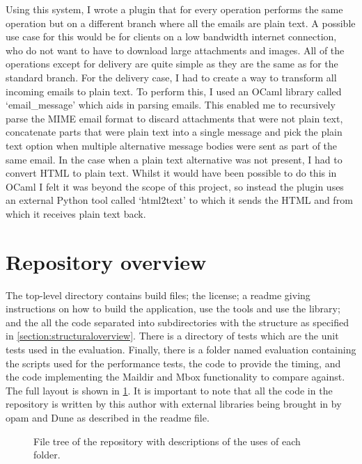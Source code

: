 Using this system, I wrote a plugin that for every operation performs the same operation but on a different branch where all the emails are plain text. A possible use case for this would be for clients on a low bandwidth internet connection, who do not want to have to download large attachments and images. All of the operations except for delivery are quite simple as they are the same as for the standard branch. For the delivery case, I had to create a way to transform all incoming emails to plain text. To perform this, I used an OCaml library called `email\_message' which aids in parsing emails. This enabled me to recursively parse the MIME email format to discard attachments that were not plain text, concatenate parts that were plain text into a single message and pick the plain text option when multiple alternative message bodies were sent as part of the same email. In the case when a plain text alternative was not present, I had to convert HTML to plain text. Whilst it would have been possible to do this in OCaml I felt it was beyond the scope of this project, so instead the plugin uses an external Python tool called `html2text' to which it sends the HTML and from which it receives plain text back.

\section{Repository overview}

The top-level directory contains build files; the license; a readme giving instructions on how to build the application, use the tools and use the library; and the all the code separated into subdirectories with the structure as specified in \ref{section:structuraloverview}. There is a directory of tests which are the unit tests used in the evaluation. Finally, there is a folder named evaluation containing the scripts used for the performance tests, the code to provide the timing, and the code implementing the Maildir and Mbox functionality to compare against. The full layout is shown in \ref{fig:repositorytree}. It is important to note that all the code in the repository is written by this author with external libraries being brought in by opam and Dune as described in the readme file.

\begin{figure}[h]
\footnotesize
\renewcommand\DTstylecomment{\rmfamily\fontfamily{bch}}
\caption{File tree of the repository with descriptions of the uses of each folder.}
\label{fig:repositorytree}
\end{figure}

